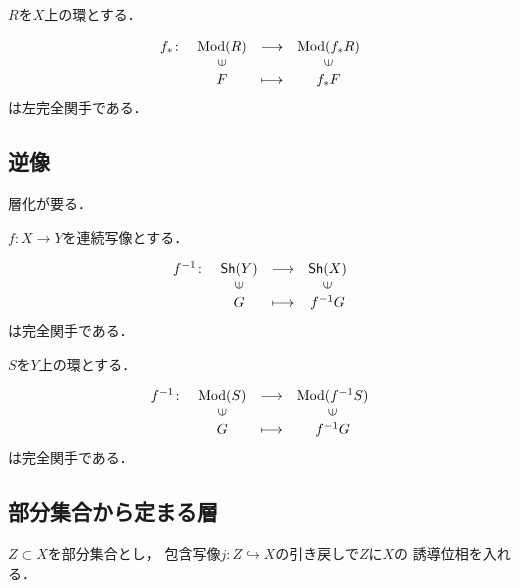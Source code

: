 \(R\)を\(X\)上の環とする．
\begin{PRP}
    \[
        \begin{array}{rccc}
            f_\ast\colon&   \Mod(R)& \longrightarrow& \Mod(f_\ast R)\\
            &   \rotatebox{90}{$\in$}&&\rotatebox{90}{$\in$}\\
            &   F&  \longmapsto&    f_\ast F   
        \end{array}
    \]
    は左完全関手である．
\end{PRP}


\subsection{逆像}
層化が要る．

\(f\colon X\to Y\)を連続写像とする．

\begin{PRP}
    \[
        \begin{array}{rccc}
            f^{-1}\colon&   \Sh(Y) & \longrightarrow& \Sh(X) \\
            &   \rotatebox{90}{$\in$}&&\rotatebox{90}{$\in$}\\
            &   G&  \longmapsto&    f^{-1} G   
        \end{array}
    \]
    は完全関手である．
\end{PRP}


\(S\)を\(Y\)上の環とする．

\begin{PRP}
    \[
        \begin{array}{rccc}
            f^{-1}\colon&   \Mod(S)& \longrightarrow& \Mod(f^{-1}S)\\
            &   \rotatebox{90}{$\in$}&&\rotatebox{90}{$\in$}\\
            &   G&  \longmapsto&    f^{-1} G   
        \end{array}
    \]
    は完全関手である．
\end{PRP}



\subsection{部分集合から定まる層}

\(Z\subset X\)を部分集合とし，
包含写像\(j\colon Z\hookrightarrow X\)の引き戻しで\(Z\)に\(X\)の
誘導位相を入れる．

